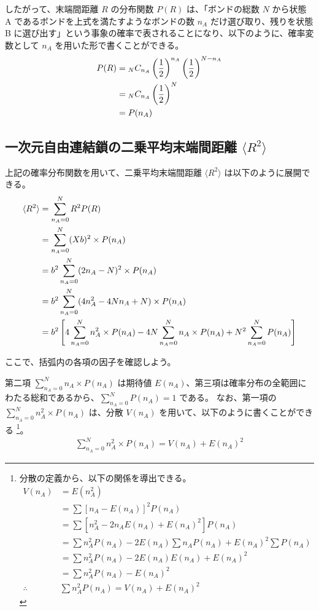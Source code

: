 \documentclass[uplatex,dvipdfmx,a4paper,11pt, titlepage]{jsarticle}
\begin{document}
\begin{appendix}
したがって、末端間距離 $R$ の分布関数 $P(R)$ は、「ボンドの総数 $N$ から状態 A であるボンドを上式を満たすようなボンドの数 $n_A$ だけ選び取り、残りを状態 B に選び出す」という事象の確率で表されることになり、以下のように、確率変数として $n_A$ を用いた形で書くことができる。
\begin{align*}
P(R)
	&= {}_N C_{n_A} \left(\dfrac{1}{2} \right)^{n_A} \left(\dfrac{1}{2} \right)^{N-n_A} \notag \\
	&= {}_N C_{n_A} \left(\dfrac{1}{2} \right)^N \\
	&= P(n_A)
\end{align*}

\subsection{一次元自由連結鎖の二乗平均末端間距離 $\langle R^2 \rangle$}
\label{ssec:1DRW_R2}

上記の確率分布関数を用いて、二乗平均末端間距離 $\langle R^2 \rangle$ は以下のように展開できる。
\begin{align*}
\langle R^2 \rangle 
	&= \sum_{n_A = 0}^{N} R^2 P(R) \notag \\
	&= \sum_{n_A = 0}^{N} (Xb)^2 \times P(n_A) \notag \\
	&= b^2 \sum_{n_A = 0}^{N} (2n_A - N)^2 \times P(n_A) \notag \\
	&= b^2 \sum_{n_A = 0}^{N} (4n_A^2 -4Nn_A + N) \times P(n_A) \notag \\
	&= b^2 \left[ 4 \sum_{n_A = 0}^{N} n_A^2 \times P(n_A) - 4N\sum_{n_A = 0}^{N} n_A \times P(n_A) + N^2 \sum_{n_A = 0}^{N} P(n_A) \right]
\end{align*}

ここで、括弧内の各項の因子を確認しよう。

第二項 $\displaystyle \sum_{n_A = 0}^{N} n_A \times P(n_A)$ は期待値 $E(n_A)$、第三項は確率分布の全範囲にわたる総和であるから、$\displaystyle \sum_{n_A = 0}^{N} P(n_A) =1$ である。
なお、第一項の $\displaystyle \sum_{n_A = 0}^{N} n_A^2 \times P(n_A)$ は、分散 $V(n_A)$ を用いて、以下のように書くことができる
\footnote
{
分散の定義から、以下の関係を導出できる。
\begin{align*}
V(n_A)
	&=E(n_A^2) \\
	&=\sum [n_A - E(n_A)]^2 P(n_A)\\
	&=\sum [n_A^2 -2 n_A E(n_A) + E(n_A)^2] P(n_A)\\
	&=\sum n_A^2 P(n_A) -2 E(n_A) \sum n_A P(n_A) + E(n_A)^2 \sum P(n_A) \\
	&=\sum n_A^2 P(n_A) -2 E(n_A) E(n_A) + E(n_A)^2 \\
	&=\sum n_A^2 P(n_A) - E(n_A)^2 \\
\therefore \quad &\sum n_A^2 P(n_A) = V(n_A) + E(n_A)^2
\end{align*}
}。
\begin{align*}
\displaystyle \sum_{n_A = 0}^{N} n_A^2 \times P(n_A)
	= V(n_A)+E(n_A)^2
\end{align*}



\end{appendix}
\end{document}

